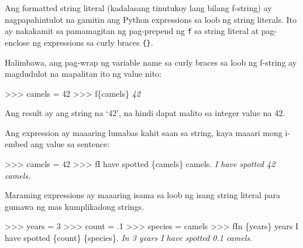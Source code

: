 \documentclass[10pt,]{book}
\newenvironment{Shaded}{}{}
\newcommand{\CommentTok}[1]{\textcolor[rgb]{0.38,0.63,0.69}{\textit{#1}}}
\newcommand{\DecValTok}[1]{\textcolor[rgb]{0.25,0.63,0.44}{#1}}
\newcommand{\FloatTok}[1]{\textcolor[rgb]{0.25,0.63,0.44}{#1}}
\newcommand{\NormalTok}[1]{#1}
\newcommand{\OperatorTok}[1]{\textcolor[rgb]{0.40,0.40,0.40}{#1}}
\newcommand{\SpecialCharTok}[1]{\textcolor[rgb]{0.25,0.44,0.63}{#1}}
\newcommand{\SpecialStringTok}[1]{\textcolor[rgb]{0.73,0.40,0.53}{#1}}
\newcommand{\StringTok}[1]{\textcolor[rgb]{0.25,0.44,0.63}{#1}}
\begin{document}

Ang formatted string literal (kadalasang tinutukoy lang bilang f-string)
ay nagpapahintulot na gamitin ang Python expressions sa loob ng string
literals. Ito ay nakakamit sa pamamagitan ng pag-prepend ng \texttt{f}
sa string literal at pag-enclose ng expressions sa curly braces
\texttt{\{\}}.

Halimbawa, ang pag-wrap ng variable name sa curly braces sa loob ng
f-string ay magdudulot na mapalitan ito ng value nito:

\begin{Shaded}
\begin{Highlighting}[]
\OperatorTok{\textgreater{}\textgreater{}\textgreater{}}\NormalTok{ camels }\OperatorTok{=} \DecValTok{42}
\OperatorTok{\textgreater{}\textgreater{}\textgreater{}} \SpecialStringTok{f\textquotesingle{}}\SpecialCharTok{\{}\NormalTok{camels}\SpecialCharTok{\}}\SpecialStringTok{\textquotesingle{}}
\CommentTok{\textquotesingle{}42\textquotesingle{}}
\end{Highlighting}
\end{Shaded}

Ang result ay ang string na `42', na hindi dapat malito sa integer value
na 42.

Ang expression ay maaaring lumabas kahit saan sa string, kaya maaari
mong i-embed ang value sa sentence:

\begin{Shaded}
\begin{Highlighting}[]
\OperatorTok{\textgreater{}\textgreater{}\textgreater{}}\NormalTok{ camels }\OperatorTok{=} \DecValTok{42}
\OperatorTok{\textgreater{}\textgreater{}\textgreater{}} \SpecialStringTok{f\textquotesingle{}I have spotted }\SpecialCharTok{\{}\NormalTok{camels}\SpecialCharTok{\}}\SpecialStringTok{ camels.\textquotesingle{}}
\CommentTok{\textquotesingle{}I have spotted 42 camels.\textquotesingle{}}
\end{Highlighting}
\end{Shaded}

Maraming expressions ay maaaring isama sa loob ng isang string literal
para gumawa ng mas kumplikadong strings.

\begin{Shaded}
\begin{Highlighting}[]
\OperatorTok{\textgreater{}\textgreater{}\textgreater{}}\NormalTok{ years }\OperatorTok{=} \DecValTok{3}
\OperatorTok{\textgreater{}\textgreater{}\textgreater{}}\NormalTok{ count }\OperatorTok{=} \FloatTok{.1}
\OperatorTok{\textgreater{}\textgreater{}\textgreater{}}\NormalTok{ species }\OperatorTok{=} \StringTok{\textquotesingle{}camels\textquotesingle{}}
\OperatorTok{\textgreater{}\textgreater{}\textgreater{}} \SpecialStringTok{f\textquotesingle{}In }\SpecialCharTok{\{}\NormalTok{years}\SpecialCharTok{\}}\SpecialStringTok{ years I have spotted }\SpecialCharTok{\{}\NormalTok{count}\SpecialCharTok{\}}\SpecialStringTok{ }\SpecialCharTok{\{}\NormalTok{species}\SpecialCharTok{\}}\SpecialStringTok{.\textquotesingle{}}
\CommentTok{\textquotesingle{}In 3 years I have spotted 0.1 camels.\textquotesingle{}}
\end{Highlighting}
\end{Shaded}
\end{document}
